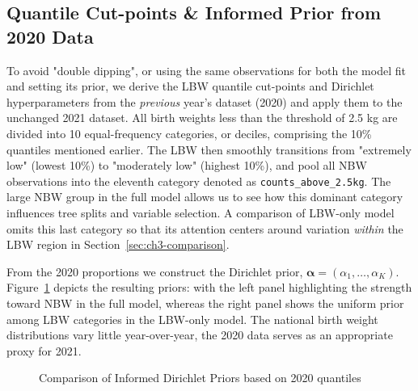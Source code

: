 \subsection{Quantile Cut-points \& Informed Prior from 2020 Data}
\label{sec:ch3-cutpoints}
To avoid "double dipping", or using the same observations for both the model fit and setting its prior, we derive the LBW quantile cut-points and Dirichlet hyperparameters from the \emph{previous} year's dataset (2020) and apply them to the unchanged 2021 dataset. All birth weights less than the threshold of 2.5 kg are divided into 10 equal-frequency categories, or deciles, comprising the 10\% quantiles mentioned earlier. The LBW then smoothly transitions from "extremely low" (lowest 10\%) to "moderately low" (highest 10\%), and pool all NBW observations into the eleventh category denoted as \texttt{counts\_above\_2.5kg}. The large NBW group in the full model allows us to see how this dominant category influences tree splits and variable selection. A comparison of LBW-only model omits this last category so that its attention centers around variation \emph{within} the LBW region in Section~\ref{sec:ch3-comparison}.

From the 2020 proportions we construct the Dirichlet prior,  \(\boldsymbol{\alpha} = (\alpha_1, \dots, \alpha_K)\). Figure~\ref{fig:alphavec} depicts the resulting priors: with the left panel highlighting the strength toward NBW in the full model, whereas the right panel shows the uniform prior among LBW categories in the LBW-only model. The national birth weight distributions vary little year-over-year, the 2020 data serves as an appropriate proxy for 2021.
\begin{figure}[htbp]
    \centering
    \qquad
    \caption{Comparison of Informed Dirichlet Priors based on 2020 quantiles}
    \label{fig:alphavec}
\end{figure}


